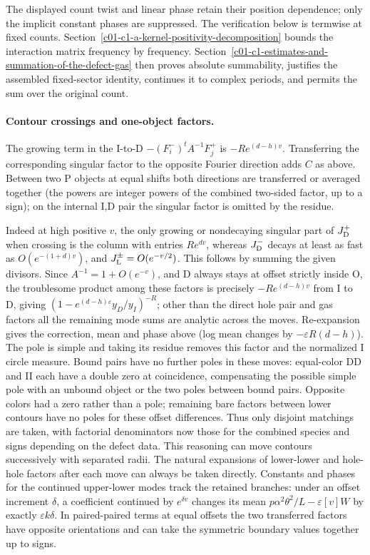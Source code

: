 The displayed count twist and linear phase retain their position dependence; only the implicit constant phases are suppressed. The verification below is termwise at fixed counts. Section~\ref{c01-c1-a-kernel-positivity-decomposition} bounds the interaction matrix frequency by frequency. Section~\ref{c01-c1-estimates-and-summation-of-the-defect-gas} then proves absolute summability, justifies the assembled fixed-sector identity, continues it to complex periods, and permits the sum over the original count.

\paragraph{Contour crossings and one-object factors.}
The growing term in the I-to-D \(- (F_i^-)^t A^{-1} F_j^+\) is \(-R e^{(d-h)v}\). Transferring the corresponding singular factor to the opposite Fourier direction adds \(C\) as above. Between two P objects at equal shifts both directions are transferred or averaged together (the powers are integer powers of the combined two-sided factor, up to a sign); on the internal I,D pair the singular factor is omitted by the residue.

Indeed at high positive \(v\), the only growing or nondecaying singular part of \(J_{\rm D}^+\) when crossing is the column with entries \(R e^{d v}\), whereas \(J_{\rm D}^-\) decays at least as fast as \(O(e^{-(1+d)v})\), and \(J_{\rm L}^\pm=O(e^{-v/2})\). This follows by summing the given divisors. Since \(A^{-1}=1+O(e^{-v})\), and D always stays at offset strictly inside O, the troublesome product among these factors is precisely \(-R e^{(d-h)v}\) from I to D, giving \((1-e^{(d-h)\varepsilon}y_D/y_I)^{-R}\); other than the direct hole pair and gas factors all the remaining mode sums are analytic across the moves. Re-expansion gives the correction, mean and phase above (log mean changes by \(-\varepsilon R(d-h)\)). The pole is simple and taking its residue removes this factor and the normalized I circle measure. Bound pairs have no further poles in these moves: equal-color DD and II each have a double zero at coincidence, compensating the possible simple pole with an unbound object or the two poles between bound pairs. Opposite colors had a zero rather than a pole; remaining bare factors between lower contours have no poles for these offset differences. Thus only disjoint matchings are taken, with factorial denominators now those for the combined species and signs depending on the defect data. This reasoning can move contours successively with separated radii. The natural expansions of lower-lower and hole-hole factors after each move can always be taken directly. Constants and phases for the continued upper-lower modes track the retained branches: under an offset increment \(\delta\), a coefficient continued by \(e^{\delta v}\) changes its mean \(p\alpha^2\theta^2/L-\varepsilon[v]W\) by exactly \(\varepsilon k\delta\). In paired-paired terms at equal offsets the two transferred factors have opposite orientations and can take the symmetric boundary values together up to signs.

